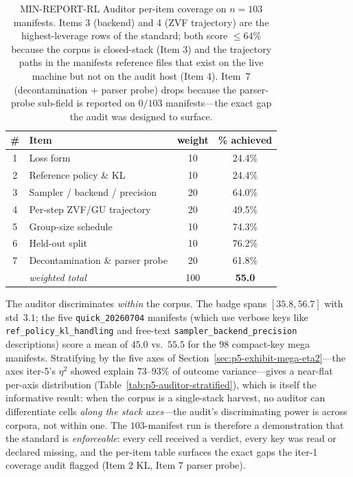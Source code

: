 \documentclass{article}  \usepackage[preprint,nonatbib]{neurips_2026} \usepackage[numbers]{natbib}
\providecommand{\tableref}[1]{Table~\ref{#1}}
\providecommand{\secref}[1]{Section~\ref{#1}}
\begin{document}
\begin{table}[t]
\centering
\caption{MIN-REPORT-RL Auditor per-item coverage on $n=103$ manifests.
Items 3 (backend) and 4 (ZVF trajectory) are the highest-leverage
rows of the standard; both score $\le 64\%$ because the corpus is
closed-stack (Item 3) and the trajectory paths in the manifests
reference files that exist on the live machine but not on the audit
host (Item 4). Item~7 (decontamination + parser probe) drops because
the parser-probe sub-field is reported on $0/103$ manifests---the
exact gap the audit was designed to surface.}
\label{tab:p5-auditor-peritem}
\small
\begin{tabular}{@{}clcc@{}}
\toprule
\# & Item & weight & \% achieved \\
\midrule
1 & Loss form                          & 10  & 24.4\% \\
2 & Reference policy \& KL             & 10  & 24.4\% \\
3 & Sampler / backend / precision      & 20  & 64.0\% \\
4 & Per-step ZVF/GU trajectory         & 20  & 49.5\% \\
5 & Group-size schedule                & 10  & 74.3\% \\
6 & Held-out split                     & 10  & 76.2\% \\
7 & Decontamination \& parser probe    & 20  & 61.8\% \\
\midrule
   & \emph{weighted total}              & 100 & \textbf{55.0} \\
\bottomrule
\end{tabular}
\end{table}

The auditor discriminates \emph{within} the corpus. The badge spans
$[35.8, 56.7]$ with std~$3.1$; the five \texttt{quick\_20260704}
manifests (which use verbose keys like
\texttt{ref\_policy\_kl\_handling} and free-text
\texttt{sampler\_backend\_precision} descriptions) score a mean of
$45.0$ vs.\ $55.5$ for the $98$ compact-key mega manifests. Stratifying
by the five axes of \secref{sec:p5-exhibit-mega-eta2}---the axes
iter-5's $\eta^{2}$ showed explain $73$--$93\%$ of outcome
variance---gives a near-flat per-axis distribution
(\tableref{tab:p5-auditor-stratified}), which is itself the
informative result: when the corpus is a single-stack harvest, no
auditor can differentiate cells \emph{along the stack axes}---the
audit's discriminating power is across corpora, not within one. The
$103$-manifest run is therefore a demonstration that the standard is
\emph{enforceable}: every cell received a verdict, every key was read
or declared missing, and the per-item table surfaces the exact gaps
the iter-1 coverage audit flagged (Item 2 KL, Item 7 parser probe).
\end{document}
